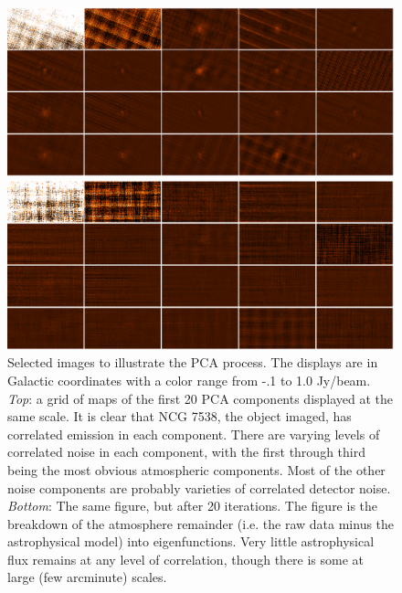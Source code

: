 \documentclass[12pt,preprint]{aastex}
\begin{document}
\begin{figure}
  \begin{minipage}{6.5in}
    \begin{center}
      \includegraphics[angle=90,scale=0.6]{eachpca}
    \end{center}
  \end{minipage}
\vspace{0.25in}
  \begin{minipage}{6.5in}
    \begin{center}
      \includegraphics[angle=90,scale=0.6]{eachpca_20iters}
    \end{center}
  \end{minipage}
  \caption{Selected images to illustrate the PCA process.  The displays are in
  Galactic coordinates with a color range from -.1 to 1.0 Jy/beam.
  {\it Top}: a grid of maps of the first 20 PCA components
displayed at the same scale.  It is clear that NCG 7538, the object
imaged, has correlated emission in each component.  There are varying
levels of correlated noise in each component, with the first through
third being the most obvious atmospheric components.  Most of the
other noise components are probably varieties of correlated
detector noise. {\it Bottom}: The same figure, but after 20
iterations.  The figure is the breakdown of the atmosphere remainder
(i.e. the raw data minus the astrophysical model) into eigenfunctions.
Very little astrophysical flux remains at any level of correlation,
though there is some at large (few arcminute) scales.}
\label{fig:PCA_Graphical}

\end{figure}
\end{document}
